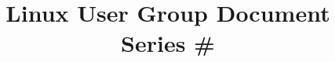 
\title{
    \vspace{-2cm}
    \begin{flushleft}
        \Huge\bfseries\color{lugblue}
        \sessiontitle
    \end{flushleft}
    \vspace{-0.5cm}
    \begin{flushleft}
        \Large\color{lugdark}
        Linux User Group Document Series \#\sessionnumber
    \end{flushleft}
}

\date{\large\sessiondate}

\newcommand{\makeabstract}{
    \begin{center}
        \colorbox{luglight}{
            \begin{minipage}{0.8\textwidth}
                \centering
                \vspace{0.5cm}
                \Large\textbf{Document Abstract}
                \vspace{0.3cm}
                
                \normalsize
                \sessionabstract
                \vspace{0.5cm}
            \end{minipage}
        }
    \end{center}
}

\newcommand{\makelicense}{
    \begin{center}
        \small\textit{This document is released under the Creative Commons Attribution 4.0 International License}
    \end{center}
}